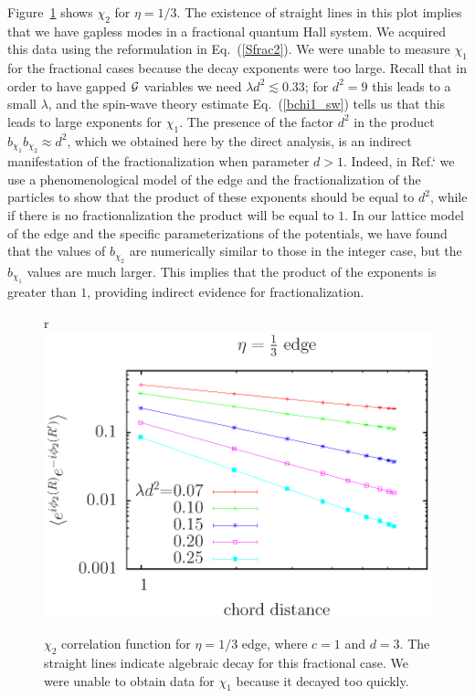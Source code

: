 Figure~\ref{onethird} shows $\chi_2$ for $\eta=1/3$. The existence of straight lines in this plot implies that we have gapless modes in a fractional quantum Hall system. We acquired this data using the reformulation in Eq.~(\ref{Sfrac2}). We were unable to measure $\chi_1$ for the fractional cases because the decay exponents were too large. Recall that in order to have gapped $\cal{G}$ variables we need $\lambda d^2 \lesssim 0.33$; for $d^2=9$ this leads to a small $\lambda$, and the spin-wave theory estimate Eq.~(\ref{bchi1_sw}) tells us that this leads to large exponents for $\chi_1$.  The presence of the factor $d^2$ in the product $b_{\chi_1} b_{\chi_2} \approx d^2$, which we obtained here by the direct analysis, is an indirect manifestation of the fractionalization when parameter $d>1$.  
Indeed, 
in Ref.`\cite{FQHE} we use a phenomenological model of the edge and the fractionalization of the particles to show that the product of these exponents should be equal to $d^2$, while if there is no fractionalization the product will be equal to $1$. In our lattice model of the edge and the specific parameterizations of the potentials, we have found that the values of $b_{\chi_2}$ are numerically similar to those in the integer case, but the $b_{\chi_1}$ values are much larger. This implies that the product of the exponents is greater than $1$, providing indirect evidence for fractionalization.

\begin{figure}{r}
\includegraphics[width=\linewidth]{figures/thirdcord.eps}
\caption{ $\chi_2$ correlation function for $\eta=1/3$ edge, where $c=1$ and $d=3$. The straight lines indicate algebraic decay for this fractional case. We were unable to obtain data for $\chi_1$ because it decayed too quickly.
\label{onethird}}
\end{figure}


